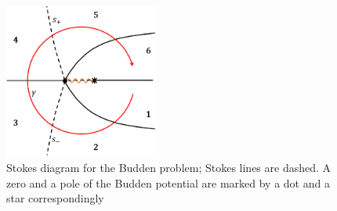 \documentclass[aip,jmp,reprint]{revtex4-1}
\def\mytextwidth{0.45\textwidth}
\begin{document}
\begin{figure}
\centering
\noindent
\includegraphics[width=\mytextwidth]{sd.png}
\caption
{Stokes diagram for the Budden problem; Stokes lines are dashed.
A zero and a pole of the Budden potential are marked by a dot and a star correspondingly}
\label{fig:diagram}
\end{figure} 
\end{document}
